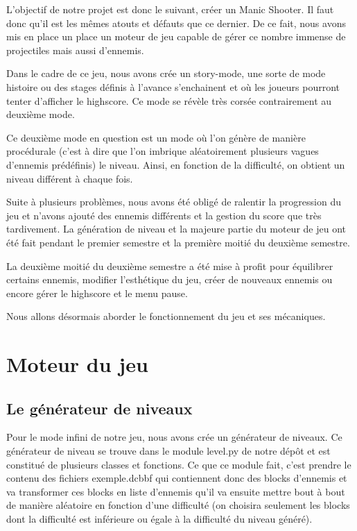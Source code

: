 \documentclass{article}
\begin{document}
L'objectif de notre projet est donc le suivant, créer un Manic Shooter. Il faut
donc qu'il est les mêmes atouts et défauts que ce dernier. De ce fait, nous
avons mis en place un place un moteur de jeu capable de gérer ce nombre immense
de projectiles mais aussi d'ennemis.

Dans le cadre de ce jeu, nous avons crée un story-mode, une sorte de mode
histoire ou des stages définis à l'avance s'enchainent et où les joueurs
pourront tenter d'afficher le highscore. Ce mode se révèle très corsée
contrairement au deuxième mode.

Ce deuxième mode en question est un mode où l'on génère de manière procédurale
(c'est à dire que l'on imbrique aléatoirement plusieurs vagues d'ennemis
prédéfinis) le niveau. Ainsi, en fonction de la difficulté, on obtient un niveau
différent à chaque fois.

Suite à plusieurs problèmes, nous avons été obligé de ralentir la progression du
jeu et n'avons ajouté des ennemis différents et la gestion du score que très
tardivement. La génération de niveau et la majeure partie du moteur de jeu ont
été fait pendant le premier semestre et la première moitié du deuxième semestre.

La deuxième moitié du deuxième semestre a été mise à profit pour équilibrer
certains ennemis, modifier l'esthétique du jeu, créer de nouveaux ennemis ou
encore gérer le highscore et le menu pause.

Nous allons désormais aborder le fonctionnement du jeu et ses mécaniques.

\section{Moteur du jeu}

\subsection{Le générateur de niveaux}

Pour le mode infini de notre jeu, nous avons crée un générateur de niveaux. Ce
générateur de niveau se trouve dans le module level.py de notre dépôt et est
constitué de plusieurs classes et fonctions. Ce que ce module fait, c'est
prendre le contenu des fichiers exemple.dcbbf qui contiennent donc des blocks
d'ennemis et va transformer ces blocks en liste d'ennemis qu'il va ensuite
mettre bout à bout de manière aléatoire en fonction d'une difficulté (on
choisira seulement les blocks dont la difficulté est inférieure ou égale à la
difficulté du niveau généré).
\end{document}
